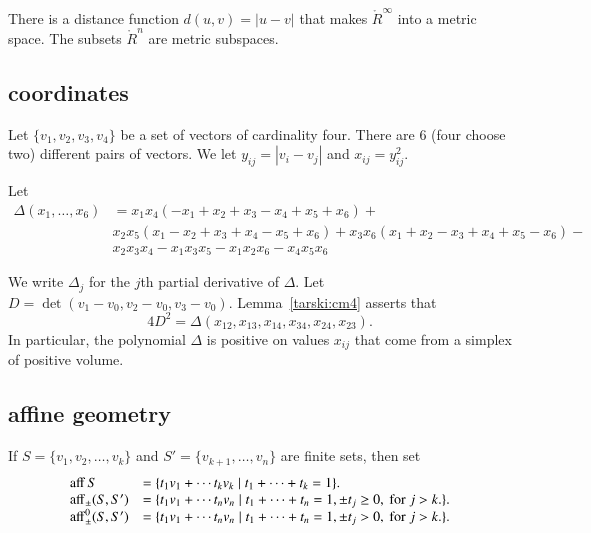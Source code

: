 There is a distance function $d(u,v) = | u - v|$ that makes
$\ring{R}^\infty$ into a metric space.  The subsets $\ring{R}^n$ are
metric subspaces.






\subsection{coordinates}

Let $\{v_1,v_2,v_3,v_4\}$ be a set of vectors of cardinality four.
There are $6$ (four choose two) different pairs of vectors. We let
$y_{ij} = |v_i-v_j|$ and $x_{ij}=y_{ij}^2$.


\begin{definition}\label{def:delta}  Let 
$$
\begin{array}{lll}
\Delta(x_1,\ldots,x_6) &= x_1 x_4 (- x_1+x_2+x_3- x_4+x_5+x_6)+\\&
            x_2 x_5 (x_1- x_2+x_3+x_4- x_5+x_6)
            +x_3 x_6 (x_1+x_2- x_3+x_4+x_5- x_6)
            - \\&x_2 x_3 x_4- x_1 x_3 x_5- x_1 x_2 x_6- x_4 x_5 x_6
\end{array}
$$
\end{definition}

We write $\Delta_j$ for the $j$th partial derivative of $\Delta$. 
Let $D = \det(v_1-v_0,v_2-v_0,v_3-v_0)$.
Lemma~\ref{tarski:cm4} asserts that 
  $$
  4 D^2 = \Delta(x_{12},x_{13},x_{14},x_{34},x_{24},x_{23}).
  $$
In particular, the polynomial $\Delta$ is positive on values $x_{ij}$
that come from a simplex of positive volume.





\subsection{affine geometry}


\begin{definition}\label{def:aff} 
 If $S = \{v_1,v_2,\ldots,v_k\}$ 
and $S'=\{v_{k+1},\ldots,v_n\}$ are  finite sets, then
set
	$$\begin{array}{lll}
      {\operatorname{aff}}\, S &= \{t_1 v_1 +\cdots t_k v_k \mid
	t_1 +\cdots+t_k = 1\}.\\
        {\operatorname{aff}}_{\pm} (S,S') &= \{t_1 v_1 +\cdots t_n v_n \mid
	t_1 +\cdots+t_n = 1, \pm t_j \ge 0, \text{ for } j>k.\}.\\
        {\operatorname{aff}}^0_{\pm} (S,S') &= \{t_1 v_1 +\cdots t_n v_n \mid
	t_1 +\cdots+t_n = 1, \pm t_j > 0, \text{ for } j>k.\}.\\
		\end{array}
        $$
\end{definition}

